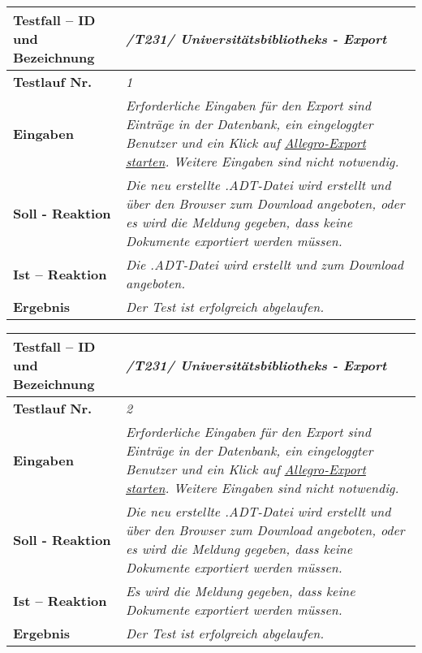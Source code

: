 \begin{longtable}{|p{5cm}|p{10cm}|}
\hline
\textbf{Testfall -- ID und Bezeichnung} &
\textit{/T231/ Universitätsbibliotheks - Export} \\
\hline 
\textbf{Testlauf Nr.} & \textit{1} \\
\hline
\textbf{Eingaben} & \textit{Erforderliche Eingaben für den Export sind Einträge in der
Datenbank, ein eingeloggter Benutzer und ein Klick auf \uline{Allegro-Export
starten}. Weitere Eingaben sind nicht notwendig. } \\
\hline
\textbf{Soll - Reaktion} & \textit{Die neu erstellte .ADT-Datei wird erstellt
und über den Browser zum Download angeboten, oder es wird die Meldung gegeben,
dass keine Dokumente exportiert werden müssen. } \\
\hline
\textbf{Ist -- Reaktion} & \textit{Die .ADT-Datei wird erstellt und zum
Download angeboten. } \\
\hline
\textbf{Ergebnis} & \textit{Der Test ist erfolgreich abgelaufen. } \\
\hline
\end{longtable}

\begin{longtable}{|p{5cm}|p{10cm}|}
\hline
\textbf{Testfall -- ID und Bezeichnung} &
\textit{/T231/ Universitätsbibliotheks - Export} \\
\hline 
\textbf{Testlauf Nr.} & \textit{2} \\
\hline
\textbf{Eingaben} & \textit{Erforderliche Eingaben für den Export sind Einträge in der
Datenbank, ein eingeloggter Benutzer und ein Klick auf \uline{Allegro-Export
starten}. Weitere Eingaben sind nicht notwendig. } \\
\hline
\textbf{Soll - Reaktion} & \textit{Die neu erstellte .ADT-Datei wird erstellt
und über den Browser zum Download angeboten, oder es wird die Meldung gegeben,
dass keine Dokumente exportiert werden müssen. } \\
\hline
\textbf{Ist -- Reaktion} & \textit{Es wird die Meldung gegeben, dass keine
Dokumente exportiert werden müssen. } \\
\hline
\textbf{Ergebnis} & \textit{Der Test ist erfolgreich abgelaufen. } \\
\hline
\end{longtable}
